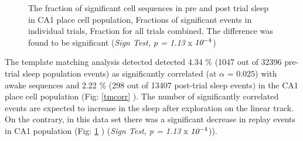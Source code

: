 \begin{figure}[H!]
\centering
{}
\caption[Pre and post trial sleep events CA1]{The fraction of significant cell sequences in pre and post trial sleep in CA1 place cell population,  Fractions of significant events in individual trials,  Fraction for all trials combined. The difference was found to be significant (\emph{Sign Test, p = 1.13} x $\emph{10}^{-4}$)}
\label{fig:pre2postca1}
\end{figure}
The template matching analysis detected detected 4.34 \% (1047 out of 32396 pre-trial sleep population events) as significantly correlated (at $ \alpha $ = $0.025$) with awake sequences and 2.22 \% (298 out of 13407 post-trial sleep events) in the CA1 place cell population (Fig: \ref{tmcorr} ). The number of significantly correlated events are expected to increase in the sleep after exploration on the linear track. On the contrary, in this data set there was a significant decrease in replay events in CA1 population (Fig: \ref{fig:pre2postca1} ) (\emph{Sign Test, p =  1.13} x $\emph{10}^{-4}$)).
